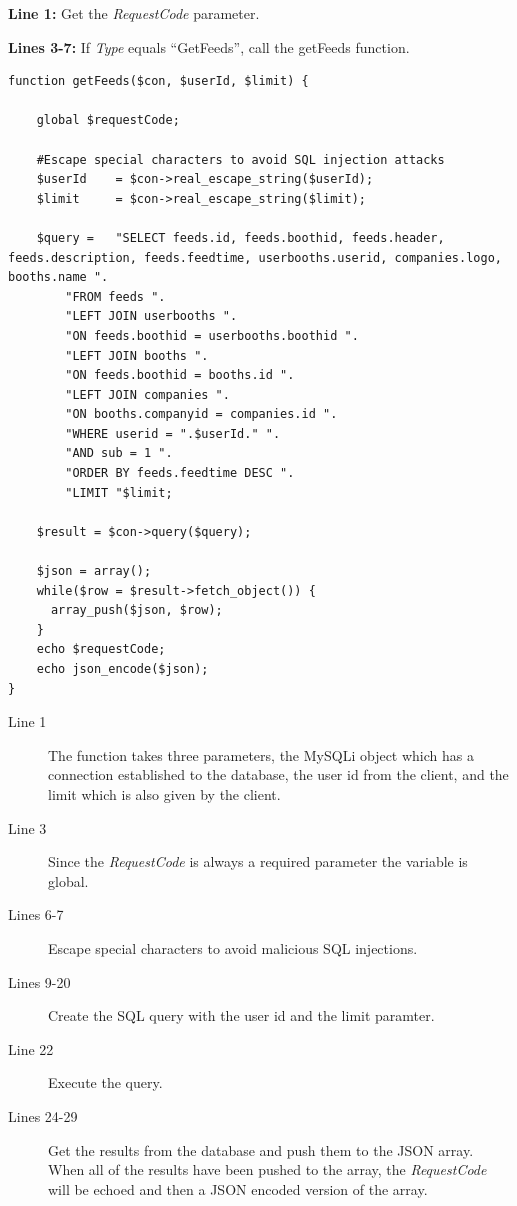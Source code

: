 \begin{description}
\item \textbf{Line 1: }Get the \textit{RequestCode} parameter.
\item \textbf{Lines 3-7: }If \textit{Type} equals ``GetFeeds'', call the getFeeds function.
\end{description}


\begin{lstlisting}[language=phpstyle, label=lst:getFeeds, caption={getFeeds function}]
function getFeeds($con, $userId, $limit) {

    global $requestCode;

    #Escape special characters to avoid SQL injection attacks
    $userId    = $con->real_escape_string($userId);
    $limit     = $con->real_escape_string($limit);

    $query =   "SELECT feeds.id, feeds.boothid, feeds.header, feeds.description, feeds.feedtime, userbooths.userid, companies.logo, booths.name ".
        "FROM feeds ".
        "LEFT JOIN userbooths ".
        "ON feeds.boothid = userbooths.boothid ".
        "LEFT JOIN booths ".
        "ON feeds.boothid = booths.id ".
        "LEFT JOIN companies ".
        "ON booths.companyid = companies.id ".
        "WHERE userid = ".$userId." ".
        "AND sub = 1 ".
        "ORDER BY feeds.feedtime DESC ".
        "LIMIT "$limit;

    $result = $con->query($query);

    $json = array();
    while($row = $result->fetch_object()) {
      array_push($json, $row);
    }
    echo $requestCode;
    echo json_encode($json);
}
\end{lstlisting}%

\begin{description}
\item[Line 1] The function takes three parameters, the MySQLi object which has a connection
  established to the database, the user id from the client, and the limit which is also given by the client.
\item[Line 3] Since the \textit{RequestCode} is always a required parameter the variable is global.
\item[Lines 6-7] Escape special characters to avoid malicious SQL injections.
\item[Lines 9-20] Create the SQL query with the user id and the limit paramter.
\item[Line 22] Execute the query.
\item[Lines 24-29] Get the results from the database and push them to the JSON array. When
  all of the results have been pushed to the array, the \textit{RequestCode} will be echoed and then
  a JSON encoded version of the array.
\end{description}

